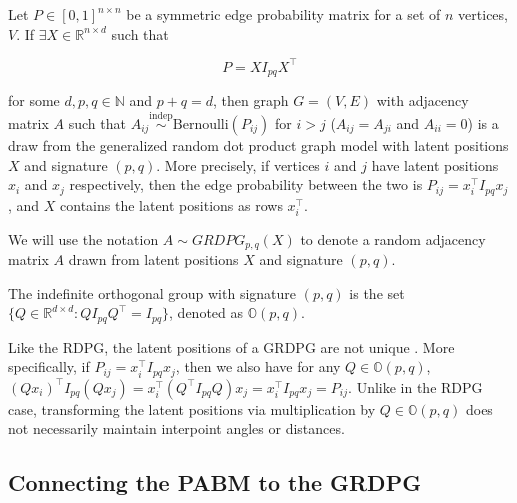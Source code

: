\documentclass[12pt]{article}
\begin{document}
\begin{definition} 
\label{grdpg} 
Let $P \in [0, 1]^{n \times n}$ be a symmetric edge probability matrix for a 
set of $n$ vertices, $V$. If $\exists X \in \mathbb{R}^{n \times d}$ such that 

\begin{equation} \label{eq:grdpg}
  P = X I_{pq} X^\top
\end{equation}

for some $d, p, q \in \mathbb{N}$ and $p + q = d$, then 
graph $G = (V, E)$ with adjacency matrix $A$ such that 
$A_{ij} \stackrel{\text{indep}}{\sim}\text{Bernoulli}(P_{ij})$ for $i > j$ ($A_{ij} = A_{ji}$ and 
$A_{ii} = 0$) is a draw from the generalized random dot product graph model 
with latent positions $X$ and signature $(p, q)$. More precisely, if vertices 
$i$ and $j$ have latent positions $x_i$ and $x_j$ respectively, then the edge 
probability between the two is $P_{ij} = x_i^\top I_{pq} x_j$, and $X$ contains 
the latent positions as rows $x_i^\top$. 
\end{definition}

We will use the notation \(A \sim GRDPG_{p,q}(X)\) to denote a random
adjacency matrix \(A\) drawn from latent positions \(X\) and signature
\((p, q)\).

\begin{definition} 
The indefinite orthogonal group with signature $(p, q)$ is 
the set $\{Q \in \mathbb{R}^{d \times d} : Q I_{pq} Q^{\top} = I_{pq}\}$, 
denoted as $\mathbb{O}(p, q)$.
\end{definition}

\begin{remark}
Like the RDPG, the latent positions of a GRDPG are not unique 
\cite{rubindelanchy2017statistical}. 
More specifically, if $P_{ij} = x_i^\top I_{pq} x_j$, then we also have for any 
$Q \in \mathbb{O}(p, q)$, 
$(Q x_i)^\top I_{pq} (Q x_j) = x_i^\top (Q^\top I_{pq} Q) x_j = 
x_i^\top I_{pq} x_j = P_{ij}$. 
Unlike in the RDPG case, transforming the latent positions via multiplication 
by $Q \in \mathbb{O}(p, q)$ does not necessarily maintain interpoint angles or 
distances. 
\end{remark}

\hypertarget{connecting-the-pabm-to-the-grdpg}{%
\subsection{Connecting the PABM to the
GRDPG}\label{connecting-the-pabm-to-the-grdpg}}
\end{document}
